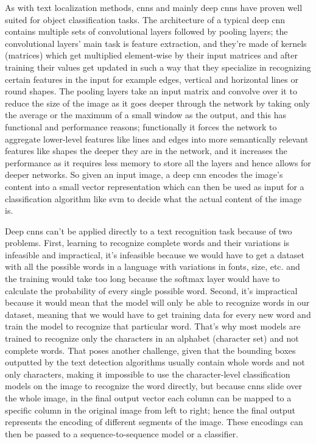 As with text localization methods, \gls{cnn}s and mainly deep \gls{cnn}s have proven well suited for object classification tasks. The architecture of a typical deep \gls{cnn} contains multiple sets of convolutional layers followed by pooling layers; the convolutional layers' main task is feature extraction, and they're made of kernels (matrices) which get multiplied element-wise by their input matrices and after training their values get updated in such a way that they specialize in recognizing certain features in the input for example edges, vertical and horizontal lines or round shapes. The pooling layers take an input matrix and convolve over it to reduce the size of the image as it goes deeper through the network by taking only the average or the maximum of a small window as the output, and this has functional and performance reasons; functionally it forces the network to aggregate lower-level features like lines and edges into more semantically relevant features like shapes the deeper they are in the network, and it increases the performance as it requires less memory to store all the layers and hence allows for deeper networks. So given an input image, a deep \gls{cnn} encodes the image's content into a small vector representation which can then be used as input for a classification algorithm like \gls{svm} to decide what the actual content of the image is.

Deep \gls{cnn}s can't be applied directly to a text recognition task because of two problems. First, learning to recognize complete words and their variations is infeasible and impractical, it's infeasible because we would have to get a dataset with all the possible words in a language with variations in fonts, size, etc. and the training would take too long because the softmax layer would have to calculate the probability of every single possible word. Second, it's impractical because it would mean that the model will only be able to recognize words in our dataset, meaning that we would have to get training data for every new word and train the model to recognize that particular word. That's why most models are trained to recognize only the characters in an alphabet (character set) and not complete words. That poses another challenge, given that the bounding boxes outputted by the text detection algorithms usually contain whole words and not only characters, making it impossible to use the character-level classification models on the image to recognize the word directly, but because \gls{cnn}s slide over the whole image, in the final output vector each column can be mapped to a specific column in the original image from left to right; hence the final output represents the encoding of different segments of the image. These encodings can then be passed to a sequence-to-sequence model or a classifier.

